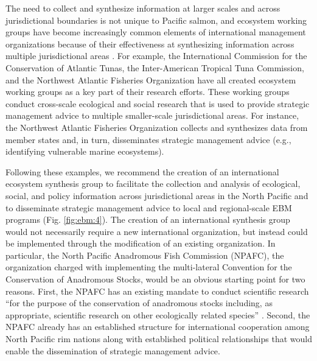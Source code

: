The need to collect and synthesize information at larger scales and
across jurisdictional boundaries is not unique to Pacific salmon, and
ecosystem working groups have become increasingly common elements of
international management organizations because of their effectiveness at
synthesizing information across multiple jurisdictional areas
\citep{Engler2015, Lascelles2014}. For example, the International
Commission for the Conservation of Atlantic Tunas, the Inter-American
Tropical Tuna Commission, and the Northwest Atlantic Fisheries
Organization have all created ecosystem working groups as a key part of
their research efforts. These working groups conduct cross-scale
ecological and social research that is used to provide strategic
management advice to multiple smaller-scale jurisdictional areas. For
instance, the Northwest Atlantic Fisheries Organization collects and
synthesizes data from member states and, in turn, disseminates strategic
management advice (e.g., identifying vulnerable marine ecosystems).

Following these examples, we recommend the creation of an international
ecosystem synthesis group to facilitate the collection and analysis of
ecological, social, and policy information across jurisdictional areas in the
North Pacific and to disseminate strategic management advice to local and
regional-scale EBM programs (Fig. \ref{fig:ebm:4}). The creation of an
international synthesis group would not necessarily require a new international
organization, but instead could be implemented through the modification of an
existing organization. In particular, the North Pacific Anadromous Fish
Commission (NPAFC), the organization charged with implementing the multi-lateral
Convention for the Conservation of Anadromous Stocks, would be an obvious
starting point for two reasons. First, the NPAFC has an existing mandate to
conduct scientific research ``for the purpose of the conservation of anadromous
stocks including, as appropriate, scientific research on other ecologically
related species'' \citep{CCAS1992}. Second, the NPAFC already has an established
structure for international cooperation among North Pacific rim nations along
with established political relationships that would enable the dissemination of
strategic management advice.

